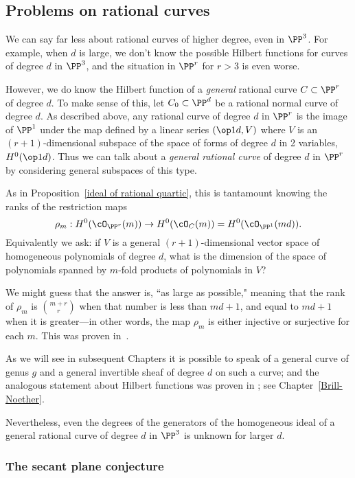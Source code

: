 \subsection{Problems on rational curves}

We can say far less about rational curves of higher degree, even in $\PP^3$. For example, when $d$ is large, we
don't know the possible Hilbert functions for curves of degree $d$ in $\PP^3$, and the situation in $\PP^r$ for
$r>3$ is even worse.

However, we do know the Hilbert function of a \emph{general} rational curve $C \subset \PP^r$ of degree $d$. To make sense of this, let $C_0 \subset \PP^d$ be a rational normal curve of degree $d$. 
As described above, any rational curve of degree $d$ in $\PP^r$ is the image of $\PP^1$ under the map defined by
a linear series $(\op1d, V)$ where $V$ is an $(r+1)$-dimensional subspace of the space of
forms of degree $d$ in 2 variables, $H^0(\op1d)$. Thus we can talk about a \emph{general rational curve} of degree $d$ in $\PP^r$ by considering general subspaces of this type.

As in Proposition~\ref{ideal of rational quartic}, this is tantamount knowing the ranks of the restriction maps
$$
\rho_m : H^0(\cO_{\PP^r}(m)) \to H^0(\cO_C(m)) = H^0(\cO_{\PP^1}(md)).
$$
Equivalently we ask: if $V$ is a general  $(r+1)$-dimensional vector space of homogeneous polynomials of degree $d$, what is the dimension of the space of polynomials spanned by $m$-fold products of polynomials in $V$? 

We might guess that the answer is, ``as large as possible," meaning that the rank of $\rho_m$ is $\binom{m+r}{r}$ when that number is less than $md+1$, and equal to $md+1$ when it is greater---in other words, the map $\rho_m$ is either injective or surjective for each $m$. This was proven in~\cite{Ballico-Ellia83}. 

As we will see in subsequent Chapters it is possible to speak of a general curve of genus $g$
and a general invertible sheaf of degree $d$ on such a curve; and the analogous statement 
about Hilbert functions  was proven in \cite{ELarson2018}; see Chapter~\ref{Brill-Noether}.

Nevertheless, even the degrees of the generators of the homogeneous ideal of a general
rational curve of degree $d$ in $\PP^3$ is unknown for larger $d$. 

\subsubsection{The secant plane conjecture}

